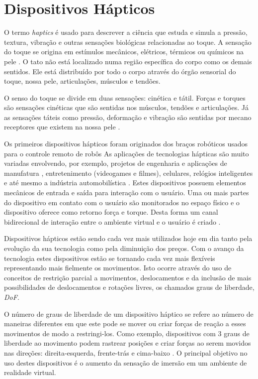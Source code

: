 \section{Dispositivos Hápticos}

O termo \textit{haptics} é usado para descrever a ciência que estuda e simula a pressão, textura, vibração e outras sensações biológicas relacionadas ao toque. A sensação do toque se origina em estímulos mecânicos, elétricos, térmicos ou químicos na pele \cite{Burdea1996}. O tato não está localizado numa região específica do corpo como os demais sentidos. Ele está distribuído por todo o corpo através do órgão sensorial do toque, nossa pele, articulações, músculos e tendões. 

O senso do toque se divide em duas sensações: cinética e tátil. Forças e torques são sensações cinéticas que são sentidas nos músculos, tendões e articulações. Já as sensações táteis como pressão, deformação e vibração são sentidas por mecano receptores que existem na nossa pele \cite{Culbertson2018}. 

Os primeiros dispositivos hápticos foram originados dos braços robóticos usados para o controle remoto de robôs \cite{Zurawski2005} As aplicações de tecnologias hápticas são muito variadas envolvendo, por exemplo, projetos de engenharia e aplicações de manufatura \cite{Sharma2001}, entretenimento (videogames e filmes), celulares, relógios inteligentes e até mesmo a indústria automobilística \cite{Smith2019}. Estes dispositivos possuem elementos mecânicos de entrada e saída para interação com o usuário. Uma ou mais partes do dispositivo em contato com o usuário são monitorados no espaço físico e o dispositivo oferece como retorno força e torque. Desta forma um canal bidirecional de interação entre o ambiente virtual e o usuário é criado \cite{Coles2011}. 

Dispositivos hápticos estão sendo cada vez mais utilizados hoje em dia tanto pela evolução da sua tecnologia como pela diminuição dos preços. Com o avanço da tecnologia estes dispositivos estão se tornando cada vez mais flexíveis representando mais fielmente os movimentos. Isto ocorre  através do uso de conceitos de restrição parcial a movimentos, deslocamentos e da inclusão de mais possibilidades de deslocamentos e rotações livres, os chamados graus de liberdade, \textit{\acrfull{DoF}}. 

O número de graus de liberdade de um dispositivo háptico se refere ao número de maneiras diferentes em que este pode se mover ou criar forças de reação a esses movimentos de modo a restringi-los. Como exemplo, dispositivos com 3 graus de liberdade ao movimento podem rastrear posições e criar forças ao serem movidos nas direções: direita-esquerda, frente-trás e cima-baixo \cite{HAPTICSHOUSE2019}. O principal objetivo no uso destes dispositivos é o aumento da sensação de imersão em um ambiente de realidade virtual. 

